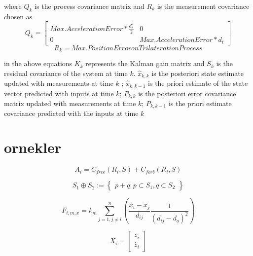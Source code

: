 \documentclass[twoside]{article}
\begin{document}
\begin{multicols}{2}
		
		where $Q_k$ is the process covariance matrix and $R_k$ is the measurement covariance chosen as 
		\begin{equation}
Q_k = \begin{bmatrix}
Max. Acceleration Error * \frac{d^2_t}{2} & 0 \\
0 & Max. Acceleration Error * d_t
\end{bmatrix}
		\end{equation}
		\begin{equation}
R_k = Max. Position Error on Trilateration Process
		\end{equation}
		
	in the above equations $K_k$ represents the Kalman gain matrix and $S_k$ is the residual covariance of the system at time $k$. $\hat{x}_{k,k}$ is the posteriori state estimate updated with measurements at time $k$ ;  $\hat{x}_{k,k-1}$ is the priori estimate of the state vector predicted with inputs at time $k$; $P_{k,k}$ is the posteriori error covariance matrix updated with measurements at time $k$; $P_{k,k-1}$ is the priori estimate covariance predicted with the inputs at time $k$
		
		
		
		
		
		
		
		\section{ornekler}
			\begin{equation}
			A_i = C_{free}(R_i,S) + C_{forb}(R_i,S)
			\end{equation}	
			
			
			
			\begin{equation}
			S_1 \oplus S_2 := \begin{Bmatrix}
			p+q : p \subset S_1, q \subset S_2
			\end{Bmatrix} 
			\end{equation}
			
			\begin{equation}
			F_{i,m,x} = k_m \sum_{j=1, j\neq{i}}^{n}\left({\frac{x_i - x_j}{{d_{ij}}} \frac{1}{\left(d_{ij} - d_o \right)^2} } \right)
			\end{equation}
			
			\begin{equation}
			X_i= \begin{bmatrix}
			z_i\\
			\dot{z_i}
			\end{bmatrix}
			\end{equation}
	
		
	\end{multicols}
	
\end{document}
